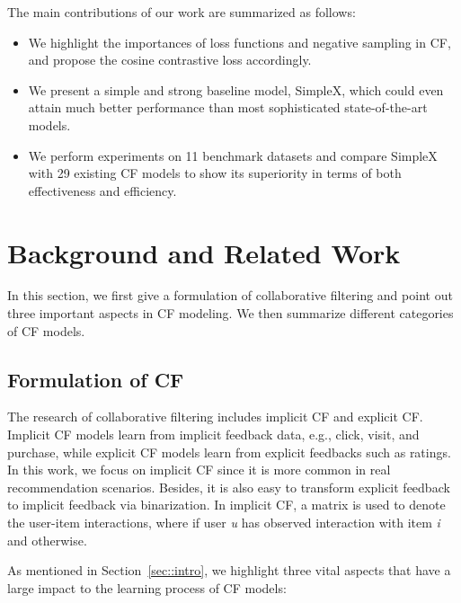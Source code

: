 \documentclass[sigconf,authorversion]{acmart}
\begin{document}
The main contributions of our work are summarized as follows:
\begin{itemize}
    \item We highlight the importances of loss functions and negative sampling in CF, and propose the cosine contrastive loss accordingly.
   
    \item We present a simple and strong baseline model, SimpleX, which could even attain much better performance than most sophisticated state-of-the-art models.
    
    \item We perform experiments on 11 benchmark datasets and compare SimpleX with 29 existing CF models to show its superiority in terms of both effectiveness and efficiency. 
\end{itemize}


















%
 \section{Background and Related Work}\label{sec:cf}

In this section, we first give a formulation of collaborative filtering  and point out three important aspects in CF modeling. We then summarize different categories of CF models.

\subsection{Formulation of CF}
The research of collaborative filtering includes implicit CF and explicit CF. Implicit CF models learn from implicit feedback data, e.g., click, visit, and purchase, while explicit CF models learn from explicit feedbacks such as ratings. 
In this work, we focus on implicit CF since it is more common in real recommendation scenarios. 
Besides, it is also easy to transform explicit feedback to implicit feedback via binarization. 
In implicit CF, a matrix  is used to denote the user-item interactions, where  if user \textit{u} has observed interaction with item \textit{i} and  otherwise.

As mentioned in Section~\ref{sec::intro}, 
we highlight three vital aspects that have a large impact to the learning process of CF models:
\end{document}
